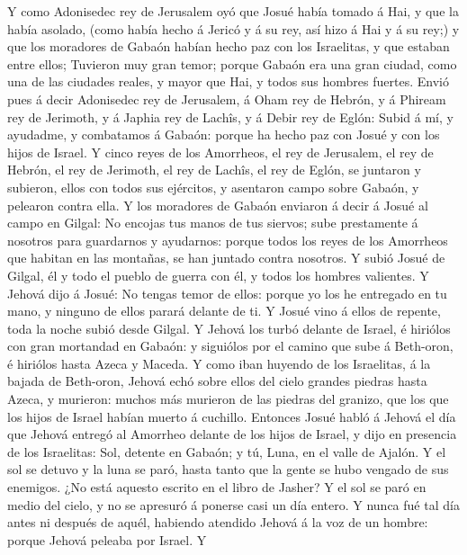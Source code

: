  Y como Adonisedec rey de Jerusalem oyó que Josué había
tomado á Hai, y que la había asolado, (como había hecho á Jericó y á su
rey, así hizo á Hai y á su rey;) y que los moradores de Gabaón habían
hecho paz con los Israelitas, y que estaban entre ellos; 
Tuvieron muy gran temor; porque Gabaón era una gran ciudad, como una de
las ciudades reales, y mayor que Hai, y todos sus hombres fuertes.
 Envió pues á decir Adonisedec rey de Jerusalem, á Oham rey
de Hebrón, y á Phiream rey de Jerimoth, y á Japhia rey de Lachîs, y á
Debir rey de Eglón:  Subid á mí, y ayudadme, y combatamos á
Gabaón: porque ha hecho paz con Josué y con los hijos de Israel.
 Y cinco reyes de los Amorrheos, el rey de Jerusalem, el rey
de Hebrón, el rey de Jerimoth, el rey de Lachîs, el rey de Eglón, se
juntaron y subieron, ellos con todos sus ejércitos, y asentaron campo
sobre Gabaón, y pelearon contra ella.  Y los moradores de
Gabaón enviaron á decir á Josué al campo en Gilgal: No encojas tus manos
de tus siervos; sube prestamente á nosotros para guardarnos y ayudarnos:
porque todos los reyes de los Amorrheos que habitan en las montañas, se
han juntado contra nosotros.  Y subió Josué de Gilgal, él y
todo el pueblo de guerra con él, y todos los hombres valientes.
 Y Jehová dijo á Josué: No tengas temor de ellos: porque yo
los he entregado en tu mano, y ninguno de ellos parará delante de ti.
 Y Josué vino á ellos de repente, toda la noche subió desde
Gilgal.  Y Jehová los turbó delante de Israel, é hiriólos
con gran mortandad en Gabaón: y siguiólos por el camino que sube á
Beth-oron, é hiriólos hasta Azeca y Maceda.  Y como iban
huyendo de los Israelitas, á la bajada de Beth-oron, Jehová echó sobre
ellos del cielo grandes piedras hasta Azeca, y murieron: muchos más
murieron de las piedras del granizo, que los que los hijos de Israel
habían muerto á cuchillo.  Entonces Josué habló á Jehová el
día que Jehová entregó al Amorrheo delante de los hijos de Israel, y
dijo en presencia de los Israelitas: Sol, detente en Gabaón; y tú, Luna,
en el valle de Ajalón.  Y el sol se detuvo y la luna se
paró, hasta tanto que la gente se hubo vengado de sus enemigos. ¿No está
aquesto escrito en el libro de Jasher? Y el sol se paró en medio del
cielo, y no se apresuró á ponerse casi un día entero.  Y
nunca fué tal día antes ni después de aquél, habiendo atendido Jehová á
la voz de un hombre: porque Jehová peleaba por Israel.  Y
